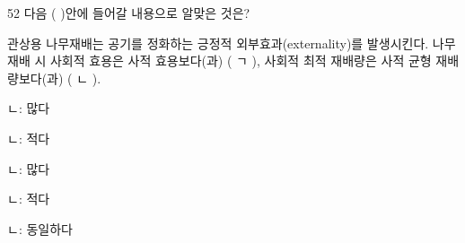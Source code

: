 \begin{question}{52}
다음 ( )안에 들어갈 내용으로 알맞은 것은?
\begin{framedtext}
관상용 나무재배는 공기를 정화하는 긍정적 외부효과(externality)를 발생시킨다. 나무재배 시 사회적 효용은 사적 효용보다(과) ( ㄱ ), 사회적 최적 재배량은 사적 균형 재배량보다(과) ( ㄴ ).
\end{framedtext}
\begin{choices}
  \item {}ㄴ: 많다
  \item {}ㄴ: 적다
  \item {}ㄴ: 많다
  \item {}ㄴ: 적다
  \item {}ㄴ: 동일하다
\end{choices}
\end{question}
